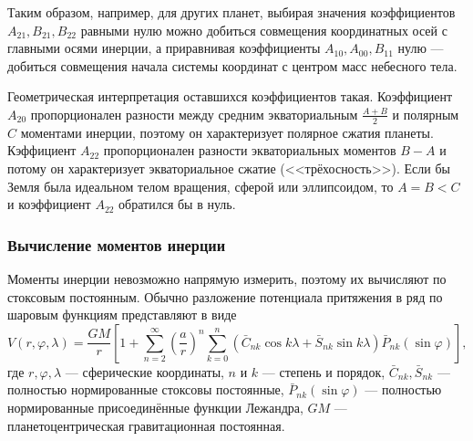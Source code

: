 \documentclass[11pt, a4paper,addpoints]{exam}
\theoremstyle{remark}
\renewcommand{\phi}{\ensuremath{\varphi}}
\begin{document}
    Таким образом, например, для других планет, выбирая значения коэффициентов $A_{21}, B_{21},
    B_{22}$ равными нулю можно добиться совмещения координатных осей с главными осями инерции, а
    приравнивая коэффициенты $A_{10}, A_{00}, B_{11}$ нулю --- добиться совмещения начала системы координат с
    центром масс небесного тела.

    Геометрическая интерпретация оставшихся коэффициентов такая. Коэффициент $A_{20}$ пропорционален
    разности между средним экваториальным $\frac{A+B}{2}$ и полярным
    $C$ моментами инерции, поэтому он характеризует полярное сжатия планеты. Кэффициент
    $A_{22}$ пропорционален разности экваториальных моментов $B-A$ и потому он характеризует
    экваториальное сжатие (<<трёхосность>>). Если бы Земля была идеальном телом вращения, сферой или
    эллипсоидом, то $A = B < C$ и коэффициент $A_{22}$ обратился бы в нуль.

    \subsubsection*{Вычисление моментов инерции}
    Моменты инерции невозможно напрямую измерить, поэтому их вычисляют по стоксовым
    постоянным. Обычно разложение потенциала притяжения в ряд по шаровым функциям представляют в виде
    \begin{equation}
        V \left( r, \phi, \lambda \right) = \dfrac{GM}{r} \left[ 1 +  
            \sum\limits_{n=2}^{\infty} \left( \dfrac{a}{r} \right)^n
        \sum\limits_{k=0}^{n} \left(  
        \bar{C}_{nk}\cos{k\lambda} + \bar{S}_{nk}\sin{k\lambda}
        \right) \bar{P}_{nk} \left( \sin{\phi} \right)\right],
    \end{equation}
    где $r, \phi, \lambda$ --- сферические координаты, $n$ и $k$ --- степень и порядок,
    $\bar{C}_{nk},\bar{S}_{nk}$ --- полностью нормированные стоксовы постоянные, 
    $\bar{P}_{nk}\left( \sin{\phi} \right)$ --- полностью нормированные присоединённые функции
    Лежандра, $GM$ --- планетоцентрическая гравитационная постоянная.
\end{document}
